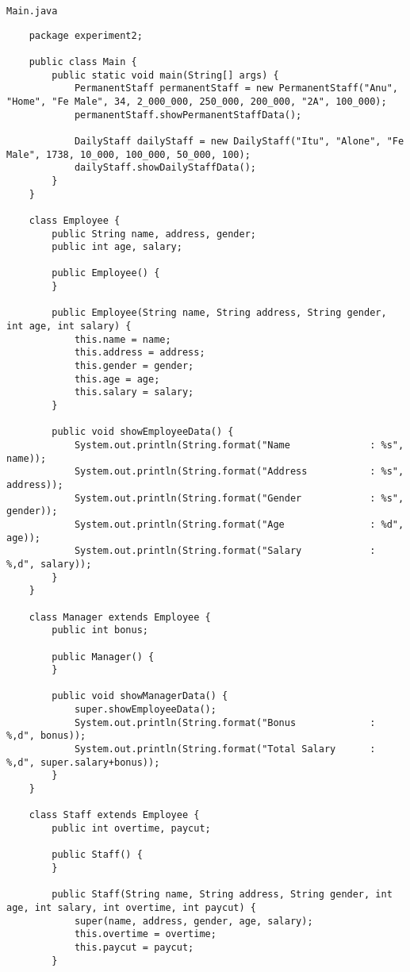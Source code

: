 \documentclass[12pt,titlepage]{article}
\begin{document}
\texttt{Main.java}
\begin{verbatim}
    package experiment2;

    public class Main {
        public static void main(String[] args) {
            PermanentStaff permanentStaff = new PermanentStaff("Anu", "Home", "Fe Male", 34, 2_000_000, 250_000, 200_000, "2A", 100_000);
            permanentStaff.showPermanentStaffData();

            DailyStaff dailyStaff = new DailyStaff("Itu", "Alone", "Fe Male", 1738, 10_000, 100_000, 50_000, 100);
            dailyStaff.showDailyStaffData();
        }
    }

    class Employee {
        public String name, address, gender;
        public int age, salary;

        public Employee() {
        }

        public Employee(String name, String address, String gender, int age, int salary) {
            this.name = name;
            this.address = address;
            this.gender = gender;
            this.age = age;
            this.salary = salary;
        }

        public void showEmployeeData() {
            System.out.println(String.format("Name              : %s", name));
            System.out.println(String.format("Address           : %s", address));
            System.out.println(String.format("Gender            : %s", gender));
            System.out.println(String.format("Age               : %d", age));
            System.out.println(String.format("Salary            : %,d", salary));
        }
    }

    class Manager extends Employee {
        public int bonus;

        public Manager() {
        }

        public void showManagerData() {
            super.showEmployeeData();
            System.out.println(String.format("Bonus             : %,d", bonus));
            System.out.println(String.format("Total Salary      : %,d", super.salary+bonus));
        }
    }

    class Staff extends Employee {
        public int overtime, paycut;
        
        public Staff() {
        }
        
        public Staff(String name, String address, String gender, int age, int salary, int overtime, int paycut) {
            super(name, address, gender, age, salary);
            this.overtime = overtime;
            this.paycut = paycut;
        }
        

\end{verbatim}
\end{document}
